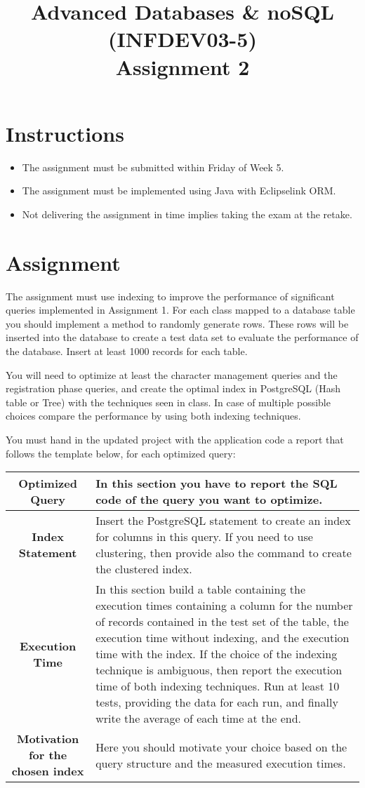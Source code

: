 \documentclass[10pt,a4paper]{article}
\title{Advanced Databases \& noSQL (INFDEV03-5) \\ Assignment 2}
\author { }
\date { }
\begin{document}
\maketitle

\section*{Instructions}
\begin{itemize}[noitemsep]
\item The assignment must be submitted within Friday of Week 5.
\item The assignment must be implemented using Java with Eclipselink ORM.
\item Not delivering the assignment in time implies taking the exam at the retake.
\end{itemize}

\section*{Assignment}
The assignment must use indexing to improve the performance of significant queries implemented in Assignment 1. For each class mapped to a database table you should implement a method to randomly generate rows. These rows will be inserted into the database to create a test data set to evaluate the performance of the database. Insert at least 1000 records for each table.

You will need to optimize at least the character management queries and the registration phase queries, and create the optimal index in PostgreSQL (Hash table or Tree) with the techniques seen in class. In case of multiple possible choices compare the performance by using both indexing techniques.

You must hand in the updated project with the application code a report that follows the template below, for each optimized query:

\vspace{0.5cm}
\begin{tabular}{|c|p{7.5cm}|}
	\hline
	\textbf{Optimized Query} & In this section you have to report the SQL code of the query you want to optimize. \\
	\hline
	\textbf{Index Statement} & Insert the PostgreSQL statement to create an index for columns in this query. If you need to use clustering, then provide also the command to create the clustered index. \\
	\hline
	\textbf{Execution Time} & In this section build a table containing the execution times containing a column for the number of records contained in the test set of the table, the execution time without indexing, and the execution time with the index. If the choice of the indexing technique is ambiguous, then report the execution time of both indexing techniques. Run at least 10 tests, providing the data for each run, and finally write the average of each time at the end. \\
	\hline
	\textbf{Motivation for the chosen index} & Here you should motivate your choice based on the query structure and the measured execution times. \\
	\hline
\end{tabular}
\end{document}
